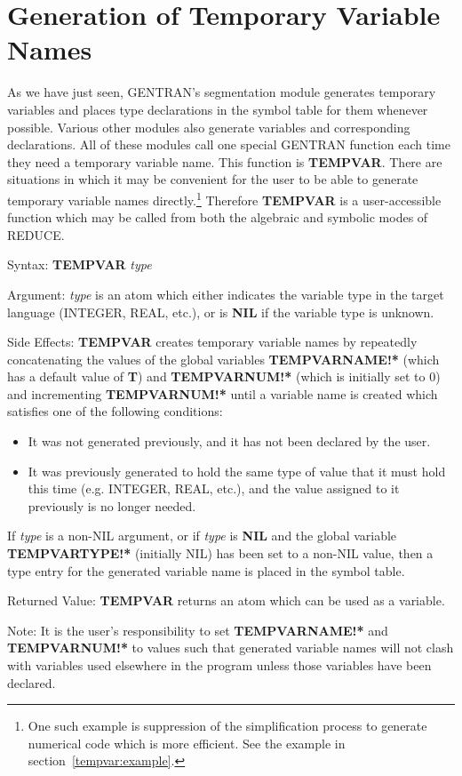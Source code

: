 \section{Generation of Temporary Variable Names}
\label{tempvars}
As we have just seen, GENTRAN's segmentation module generates
temporary variables and places type declarations in the symbol table
for them whenever possible.  Various other modules also generate
variables and corresponding declarations.  All of these modules call
one special GENTRAN function each time they need a temporary
variable name.  This function is {\bf TEMPVAR}.  There are situations
in which it may be convenient for the user to be able to generate
temporary variable names directly.\footnote{One such example is suppression of
the simplification process to generate numerical code which is more efficient.
See the example in section~\ref{tempvar:example}.}
Therefore {\bf TEMPVAR}
is a user-accessible function which may be called from both
the algebraic and symbolic modes of REDUCE.
\begin{describe}{Syntax:}
{\bf TEMPVAR} {\it type}
\end{describe}
\begin{describe}{Argument:}
{\it type} is an atom which either indicates the variable type in the
target language (INTEGER, REAL, etc.), or is {\bf NIL} if the variable
type is unknown.
\end{describe}
\begin{describe}{Side Effects:}
{\bf TEMPVAR} creates temporary variable names by repeatedly concatenating
the values of the global variables {\bf TEMPVARNAME!*} (which has a
default value of {\bf T}) and {\bf TEMPVARNUM!*} (which is initially set
to 0) and incrementing {\bf TEMPVARNUM!*} until a variable name is created
which satisfies one of the following conditions:
\begin{itemize}
\item[{(1)}]
It was not generated previously, and it has not been declared by the user.
\item[{(2)}]
It was previously generated to hold the same type of value that it
must hold this time (e.g. INTEGER, REAL, etc.), and the value assigned
to it previously is no longer needed.
\end{itemize}
If {\it type} is a non-NIL argument, or if {\it type} is {\bf NIL}
and the global variable {\bf TEMPVARTYPE!*} (initially NIL) has been
set to a non-NIL value, then a type entry for the generated variable name
is placed in the symbol table.
\end{describe}
\begin{describe}{Returned Value:}
{\bf TEMPVAR} returns an atom which can be used as a variable.
\end{describe}
Note:  It is the user's responsibility to set {\bf TEMPVARNAME!*} and 
{\bf TEMPVARNUM!*} to values such that generated variable
names will not clash with variables used elsewhere in the
program unless those variables have been declared.

